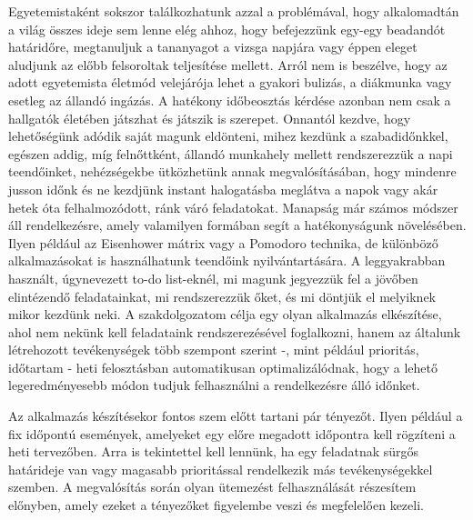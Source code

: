 
Egyetemistaként sokszor találkozhatunk azzal a problémával, hogy alkalomadtán a világ összes ideje sem lenne elég ahhoz, hogy befejezzünk egy-egy beadandót határidőre, megtanuljuk a tananyagot a vizsga napjára vagy éppen eleget aludjunk az előbb felsoroltak teljesítése mellett. Arról nem is beszélve, hogy az adott egyetemista életmód velejárója lehet a gyakori bulizás, a diákmunka vagy esetleg az állandó ingázás. A hatékony időbeosztás kérdése azonban nem csak a hallgatók életében játszhat és játszik is szerepet. Onnantól kezdve, hogy lehetőségünk adódik saját magunk eldönteni, mihez kezdünk a szabadidőnkkel, egészen addig, míg felnőttként, állandó munkahely mellett rendszerezzük a napi teendőinket, nehézségekbe ütközhetünk annak megvalósításában, hogy mindenre jusson időnk és ne kezdjünk instant halogatásba meglátva a napok vagy akár hetek óta felhalmozódott, ránk váró feladatokat.
Manapság már számos módszer áll rendelkezésre, amely valamilyen formában segít a hatékonyságunk növelésében. Ilyen például az Eisenhower mátrix vagy a Pomodoro technika, de különböző alkalmazásokat is használhatunk teendőink nyilvántartására. A leggyakrabban használt, úgynevezett to-do list-eknél, mi magunk jegyezzük fel a jövőben elintézendő feladatainkat, mi rendszerezzük őket, és mi döntjük el melyiknek mikor kezdünk neki. A szakdolgozatom célja egy olyan alkalmazás elkészítése, ahol nem nekünk kell feladataink rendszerezésével foglalkozni, hanem az általunk létrehozott tevékenységek több szempont szerint -, mint például prioritás, időtartam - heti felosztásban automatikusan optimalizálódnak, hogy a lehető legeredményesebb módon tudjuk felhasználni a rendelkezésre álló időnket.

Az alkalmazás készítésekor fontos szem előtt tartani pár tényezőt. Ilyen például a fix időpontú események, amelyeket egy előre megadott időpontra kell rögzíteni a heti tervezőben. Arra is tekintettel kell lennünk, ha egy feladatnak sürgős határideje van vagy magasabb prioritással rendelkezik más tevékenységekkel szemben. A megvalósítás során olyan ütemezést felhasználását részesítem előnyben, amely ezeket a tényezőket figyelembe veszi és megfelelően kezeli.
